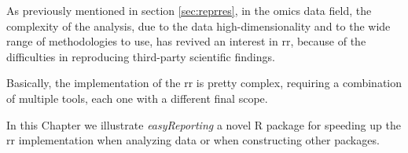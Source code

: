 As previously mentioned in section \ref{sec:reprres}, in the omics data field, the complexity of the analysis, due to the data high-dimensionality and to the wide range of methodologies to use, has revived an interest in \gls{rr}, because of the difficulties in reproducing third-party scientific findings.

Basically, the implementation of the \gls{rr} is pretty complex, requiring a combination of multiple tools, each one with a different final scope.

In this Chapter we illustrate \textit{easyReporting} a novel R package for speeding up the \gls{rr} implementation when analyzing data or when constructing other packages.
